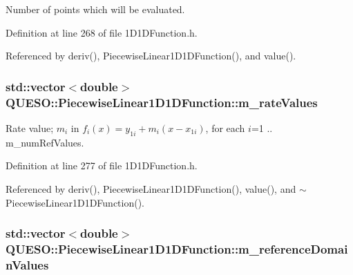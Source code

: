 Number of points which will be evaluated. 



Definition at line 268 of file 1\-D1\-D\-Function.\-h.



Referenced by deriv(), Piecewise\-Linear1\-D1\-D\-Function(), and value().

\hypertarget{class_q_u_e_s_o_1_1_piecewise_linear1_d1_d_function_aef7d37fe499c0e8f3bb6261f1b4e8147}{
\subsubsection[{m\-\_\-rate\-Values}]{\setlength{\rightskip}{0pt plus 5cm}std\-::vector$<$double$>$ Q\-U\-E\-S\-O\-::\-Piecewise\-Linear1\-D1\-D\-Function\-::m\-\_\-rate\-Values\hspace{0.3cm}{\ttfamily [protected]}}}\label{class_q_u_e_s_o_1_1_piecewise_linear1_d1_d_function_aef7d37fe499c0e8f3bb6261f1b4e8147}


Rate value; $ m_i $ in $ f_i(x) = y_{1i} + m_i (x - x_{1i})$, for each $ i $=1 .. {\ttfamily m\-\_\-num\-Ref\-Values}. 



Definition at line 277 of file 1\-D1\-D\-Function.\-h.



Referenced by deriv(), Piecewise\-Linear1\-D1\-D\-Function(), value(), and $\sim$\-Piecewise\-Linear1\-D1\-D\-Function().

\hypertarget{class_q_u_e_s_o_1_1_piecewise_linear1_d1_d_function_abda9e4143096bf0bf935b7c9173aa2cc}{
\subsubsection[{m\-\_\-reference\-Domain\-Values}]{\setlength{\rightskip}{0pt plus 5cm}std\-::vector$<$double$>$ Q\-U\-E\-S\-O\-::\-Piecewise\-Linear1\-D1\-D\-Function\-::m\-\_\-reference\-Domain\-Values\hspace{0.3cm}{\ttfamily [protected]}}}\label{class_q_u_e_s_o_1_1_piecewise_linear1_d1_d_function_abda9e4143096bf0bf935b7c9173aa2cc}


